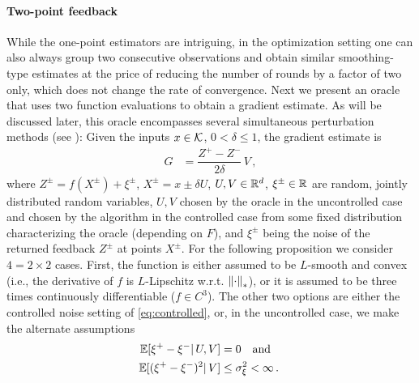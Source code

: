 \paragraph{Two-point feedback}
While the one-point estimators are intriguing,
in the optimization setting one can also always group two consecutive observations and obtain similar smoothing-type estimates 
at the price of reducing the number of rounds by a factor of two only, 
which does not change the rate of convergence.
Next we present an oracle that uses two function evaluations to obtain a gradient estimate.
As will be discussed later, this oracle encompasses several simultaneous perturbation methods (see \citealp{bhatnagar-book}):
Given the inputs $x\in \mathcal{K}$,  $0<\delta\le 1$,
the gradient estimate is
\begin{align}
G &=  \dfrac{Z^+ - Z^-}{2\delta}\, V \,, 
 \label{eq:twosp}
\end{align}
where $Z^{\pm} = f(X^{\pm}) + \xi^{\pm}$, $X^{\pm} = x \pm \delta U$, $U,V\in \mathbb{R}^d$, $\xi^{\pm}\in \mathbb{R}$ are random, jointly distributed random variables, $U,V$ chosen by the oracle in the uncontrolled case and chosen by the algorithm in the controlled case
from some fixed distribution characterizing the oracle (depending on $F$), and $\xi^{\pm}$ being the noise of the returned feedback $Z^{\pm}$ at points $X^{\pm}$.
For the following proposition we consider $4=2\times 2$ cases.
First, the function is either assumed to be $L$-smooth and convex (i.e., the derivative of $f$ is $L$-Lipschitz w.r.t. $\left\|\cdot\right\|_*$), or it is assumed to be three times continuously differentiable ($f\in C^3$).
The other two options are either the controlled noise  setting of \eqref{eq:controlled}, or, in the uncontrolled case, we make the alternate assumptions 
\begin{align}
\mathbb{E}[\xi^+-\xi^- |\, U,V] &= 0 \text{~~ and ~~}\nonumber\\
\mathbb{E} [ (\xi^{+} - \xi^-)^{2} |\, V] &\le \sigma_\xi^2 <\infty\,.
\label{eq:noiseass}
\end{align}

